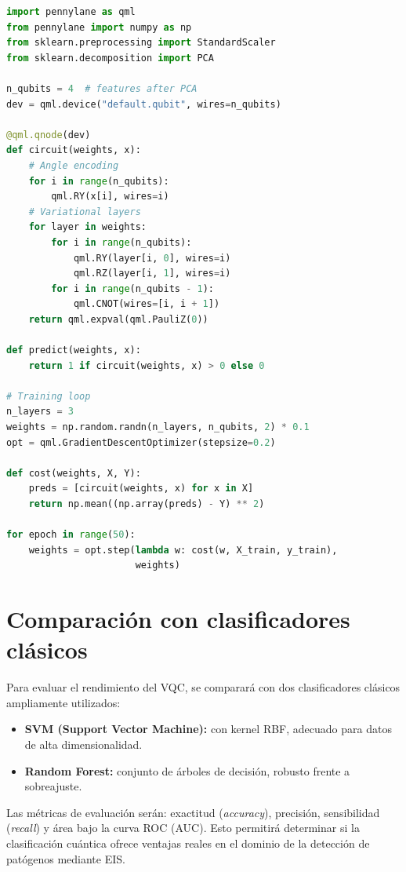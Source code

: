 \documentclass[11pt,a4paper,spanish]{book}
\begin{document}
\begin{lstlisting}[language=Python, caption={Clasificador cu\'{a}ntico variacional con PennyLane}]
import pennylane as qml
from pennylane import numpy as np
from sklearn.preprocessing import StandardScaler
from sklearn.decomposition import PCA

n_qubits = 4  # features after PCA
dev = qml.device("default.qubit", wires=n_qubits)

@qml.qnode(dev)
def circuit(weights, x):
    # Angle encoding
    for i in range(n_qubits):
        qml.RY(x[i], wires=i)
    # Variational layers
    for layer in weights:
        for i in range(n_qubits):
            qml.RY(layer[i, 0], wires=i)
            qml.RZ(layer[i, 1], wires=i)
        for i in range(n_qubits - 1):
            qml.CNOT(wires=[i, i + 1])
    return qml.expval(qml.PauliZ(0))

def predict(weights, x):
    return 1 if circuit(weights, x) > 0 else 0

# Training loop
n_layers = 3
weights = np.random.randn(n_layers, n_qubits, 2) * 0.1
opt = qml.GradientDescentOptimizer(stepsize=0.2)

def cost(weights, X, Y):
    preds = [circuit(weights, x) for x in X]
    return np.mean((np.array(preds) - Y) ** 2)

for epoch in range(50):
    weights = opt.step(lambda w: cost(w, X_train, y_train),
                       weights)
\end{lstlisting}

\section{Comparaci\'{o}n con clasificadores cl\'{a}sicos}

Para evaluar el rendimiento del VQC, se comparar\'{a} con dos clasificadores cl\'{a}sicos ampliamente utilizados:

\begin{itemize}
	\item \textbf{SVM (Support Vector Machine):} con kernel RBF, adecuado para datos de alta dimensionalidad.
	\item \textbf{Random Forest:} conjunto de \'{a}rboles de decisi\'{o}n, robusto frente a sobreajuste.
\end{itemize}

Las m\'{e}tricas de evaluaci\'{o}n ser\'{a}n: exactitud (\textit{accuracy}), precisi\'{o}n, sensibilidad (\textit{recall}) y \'{a}rea bajo la curva ROC (AUC). Esto permitir\'{a} determinar si la clasificaci\'{o}n cu\'{a}ntica ofrece ventajas reales en el dominio de la detecci\'{o}n de pat\'{o}genos mediante EIS.
\end{document}
